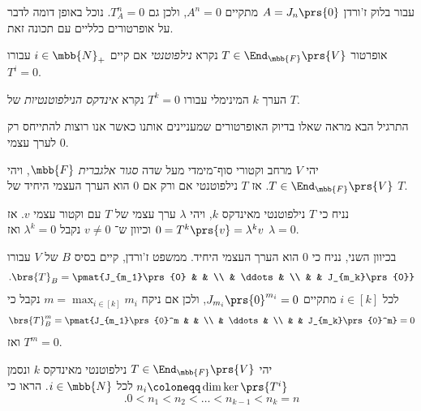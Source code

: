 \documentclass[a4paper,10pt,twoside,openany]{book}
\begin{document}
עבור בלוק ז'ורדן
$A = J_n\prs{0}$
מתקיים
$A^n = 0$,
ולכן גם
$T_A^n = 0$.
נוכל באופן דומה לדבר על אופרטורים כלליים עם תכונה זאת.

\begin{definition}
אופרטור
$T \in \End_{\mbb{F}}\prs{V}$
נקרא
\emph{נילפוטנטי}
אם קיים
$i \in \mbb{N}_+$
עבורו
$T^i = 0$.

הערך
$k$
המינימלי עבורו
$T^k = 0$
נקרא
\emph{אינדקס הנילפוטנטיות}
של
$T$.
\end{definition}

התרגיל הבא מראה שאלו בדיוק האופרטורים שמעניינים אותנו כאשר אנו רוצות להתייחס רק לערך עצמי
$0$.

\begin{exercisechap}
יהי
$V$
מרחב וקטורי סוף־מימדי מעל שדה
\emph{סגור אלגברית}
$\mbb{F}$,
ויהי
$T \in \End_{\mbb{F}}\prs{V}$.
אז
$T$
נילפוטנטי אם ורק אם
$0$
הוא הערך העצמי היחיד של
$T$.
\end{exercisechap}

\begin{solution}
נניח כי
$T$
נילפוטנטי מאינדקס
$k$, ויהי
$\lambda$
ערך עצמי של
$T$
עם וקטור עצמי
$v$.
אז
$0 = T^k\prs{v} = \lambda^k v$
וכיוון ש־%
$v \neq 0$
נקבל
$\lambda^k = 0$
ואז
$\lambda = 0$.

בכיוון השני, נניח כי
$0$
הוא הערך העצמי היחיד.
ממשפט ז'ורדן, קיים בסיס
$B$
של
$V$
עבורו
\begin{align*}
\text{.} \brs{T}_B = \pmat{J_{m_1}\prs{0} & & \\ & \ddots & \\ & & J_{m_k}\prs{0}}
\end{align*}
לכל
$i \in [k]$
מתקיים
$J_{m_i}\prs{0}^{m_i} = 0$,
ולכן אם ניקח
$m = \max_{i \in [k]} m_i$
נקבל כי
\begin{align*}
\brs{T}_B^m = \pmat{J_{m_1}\prs{0}^m & & \\ & \ddots & \\ & & J_{m_k}\prs{0}^m} = 0
\end{align*}
ואז
$T^m = 0$.
\end{solution}

\begin{exercisechap}
יהי
$T \in \End_{\mbb{F}}\prs{V}$
נילפוטנטי מאינדקס
$k$
ונסמן
$n_i \coloneqq \dim \ker\prs{T^i}$
לכל
$i \in \mbb{N}$.
הראו כי
\[\text{.} 0 < n_1 < n_2 < \ldots < n_{k-1} < n_k = n\]
\end{exercisechap}
\end{document}
